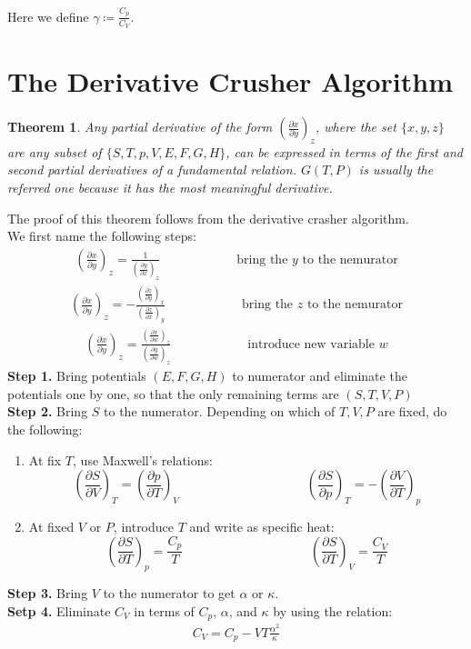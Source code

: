 \documentclass[11pt,oneside]{book}
\theoremstyle{break}
\theoremstyle{break}
\newtheorem{thm}{Theorem}[section]
\newcommand{\pd}{\partial}
\newcommand{\lr}[1]{\left( #1 \right)}
\begin{document}
Here we define $\gamma \coloneqq \frac{C_p}{C_V}$.\\

\newpage
\section[The Derivative Crusher Algorithm]{\color{red} The Derivative Crusher Algorithm\color{black}}
\begin{thm}
Any partial derivative of the form $\lr{\frac{\partial x}{\partial y}}_z$, where the set $\{x,y,z\}$ are any subset of $\{S,T,p,V,E,F,G,H\}$, can be expressed in terms of the first and second partial derivatives of a fundamental relation. $G(T,P)$ is usually the referred one because it has the most meaningful derivative. 
\end{thm}
The proof of this theorem follows from the derivative crasher algorithm. \\

We first name the following steps:
\begin{align*}
\lr{\frac{\pd x}{\pd y}}_z = \frac{1}{\lr{\frac{\pd y}{\pd x}}_z} \qquad\qquad\qquad\text{bring the }y \text{ to the nemurator}
\end{align*}
\begin{align*}
\lr{\frac{\pd x}{\pd y}}_z = -\frac{\lr{\frac{\pd z}{\pd y}}_x}{\lr{\frac{\pd z}{\pd x}}_y} \qquad\qquad\qquad\text{bring the }z \text{ to the nemurator}
\end{align*}
\begin{align*}
\lr{\frac{\pd x}{\pd y}}_z = \frac{\lr{\frac{\pd x}{\pd w}}_z}{\lr{\frac{\pd y}{\pd w}}_z} \qquad\qquad\qquad\text{introduce new variable }w
\end{align*}
\textbf{Step 1.} Bring potentials $(E,F,G,H)$ to numerator and eliminate the potentials one by one, so that the only remaining terms are $(S,T,V,P)$\\
\textbf{Step 2.} Bring $S$ to the numerator. Depending on which of $T,V,P$ are fixed, do the following:
\begin{enumerate}[topsep=3pt,itemsep=-1ex,partopsep=1ex,parsep=1ex]
\item At fix $T$, use Maxwell's relations: 
$$\lr{\frac{\pd S}{\pd V}}_T = \lr{\frac{\pd p}{\pd T}}_V \qquad\qquad\qquad\qquad\qquad\lr{\frac{\pd S}{\pd p}}_T = -\lr{\frac{\pd V}{\pd T}}_p$$
\item At fixed $V$ or $P$, introduce $T$ and write as specific heat: 
$$\lr{\frac{\pd S}{\pd T}}_p = \frac{C_p}{T}\qquad\qquad\qquad\qquad\qquad\lr{\frac{\pd S}{\pd T}}_V = \frac{C_V}{T}$$
\end{enumerate}
\textbf{Step 3.} Bring $V$ to the numerator to get $\alpha$ or $\kappa$.\\ 
\textbf{Setp 4.} Eliminate $C_V$ in terms of $C_p$, $\alpha$, and $\kappa$ by using the relation:
\begin{align*}
C_V = C_p - VT \frac{\alpha^2}{\kappa}
\end{align*}
\end{document}
